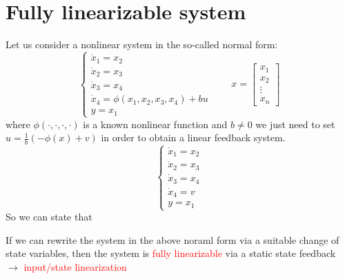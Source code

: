 \section{Fully linearizable system}
Let us consider a nonlinear system in the so-called normal form:
\[
\begin{cases}
	\dot{x}_1=x_2\\
	\dot{x}_2=x_3\\
	\dot{x}_3=x_4\\
	\dot{x}_4=\phi(x_1,x_2,x_3,x_4)+bu\\
	y=x_1
\end{cases}\qquad x=\begin{bmatrix}
x_1\\x_2\\\vdots\\x_n
\end{bmatrix}
\] where $\phi(\cdot,\cdot,\cdot,\cdot)$ is a known nonlinear function and $b\neq0$ we just need to set $u=\frac{1}{b}(-\phi(x)+v)$ in order to obtain a linear feedback system.
\[
\begin{cases}
	\dot{x}_1=x_2\\
	\dot{x}_2=x_3\\
	\dot{x}_3=x_4\\
	\dot{x}_4=v\\
	y=x_1
	\end{cases}\] So we can state that 
\begin{tcolorbox}[colframe=red!50!white, arc=0mm, colback=white]
	If we can rewrite the system in the above noraml form via a suitable change of state variables, then the system is \textcolor{red}{fully linearizable} via a static state feedback $\rightarrow$ \textcolor{red}{input/state linearization}
\end{tcolorbox}
